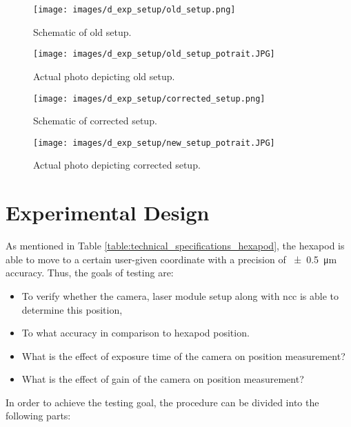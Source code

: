 \begin{figure}[h]
    \centering
    \texttt{[image: images/d\_exp\_setup/old\_setup.png]}
    \caption{Schematic of old setup.}
    \label{fig:old_setup.png}
\end{figure}

\begin{figure}[h]
    \centering
    \texttt{[image: images/d\_exp\_setup/old\_setup\_potrait.JPG]}
    \caption{Actual photo depicting old setup.}
    \label{fig:old_setup_potrait.JPG}
\end{figure}

\begin{figure}[h]
    \centering
    \texttt{[image: images/d\_exp\_setup/corrected\_setup.png]}
    \caption{Schematic of corrected setup.}
    \label{fig:corrected_setup.png}
\end{figure}

\begin{figure}[h]
    \centering
    \texttt{[image: images/d\_exp\_setup/new\_setup\_potrait.JPG]}
    \caption{Actual photo depicting corrected setup.}
    \label{fig:new_setup_potrait.JPG}
\end{figure}

\clearpage

\section{Experimental Design}

As mentioned in Table \ref{table:technical_specifications_hexapod}, the hexapod is able to move to a certain user-given coordinate with a precision of \SI{\pm0.5}{\micro\meter} accuracy. Thus, the goals of testing are:
\begin{itemize}
    \item To verify whether the camera, laser module setup along with \gls{ncc} is able to determine this position,
    \item To what accuracy in comparison to hexapod position.
    \item What is the effect of exposure time of the camera on position measurement?
    \item What is the effect of gain of the camera on position measurement?
\end{itemize}

\vspace{5mm}

\noindent In order to achieve the testing goal, the procedure can be divided into the following parts:

